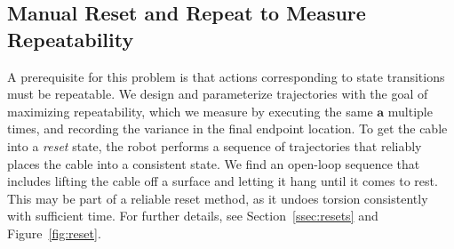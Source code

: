 \documentclass[letterpaper, 10 pt, conference]{ieeeconf}  %
\newcommand{\ba}{\mathbf{a}}
\newcommand{\remark}[3]{{\color{#2}[#1: #3]}}
\newcommand{\jeffi}[1]{\remark{JI}{red}{#1}}
\begin{document}




\subsection{Manual Reset and Repeat to Measure Repeatability}\label{sec:resets-repeat}

A prerequisite for this problem is that actions corresponding to state transitions must be repeatable. We design and parameterize trajectories with the goal of maximizing repeatability, which we measure by executing the same $\ba$ multiple times, and recording the variance in the final endpoint location.
To get the cable into a \emph{reset} state, the robot performs a sequence of trajectories that reliably places the cable into a consistent state. We find an open-loop sequence that includes lifting the cable off a surface and letting it hang until it comes to rest. This may be part of a reliable reset method, as it undoes torsion consistently with sufficient time. For further details, see Section~\ref{ssec:resets} and Figure~\ref{fig:reset}. %
\end{document}
